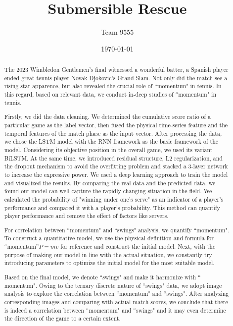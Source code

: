 \documentclass{mcmthesis}  %
\begin{document}
\title{Submersible Rescue}  %
\author{\small Team 9555}  %
\date{\today}  %



\begin{abstract}  %

	The 2023 Wimbledon \cite{vaswani2017attention} Gentlemen’s final witnessed a wonderful batter, a Spanish player ended great tennis player Novak Djokovic's Grand Slam. Not only did the match see a rising star apparence, but also revealed the crucial role of ``momentum" in tennis. In this regard, based on relevant data, we conduct in-deep studies of ``momentum" in tennis.

	Firstly, we did the data cleaning. We determined the cumulative score ratio of a particular game as the label vector, then fused the physical time-series feature and the temporal features of the match phase as the input vector. After processing the data, we chose the LSTM model with the RNN framework as the basic framework of the model. Considering its objective position in the overall game, we used its variant BiLSTM. At the same time, we introduced residual structure, L2 regularization, and the dropout mechanism to avoid the overfitting problem and stacked a 3-layer network to increase the expressive power. We used a deep learning approach to train the model and visualized the results. By comparing the real data and the predicted data, we found our model can well capture the rapidly changing situation in the field. We calculated the probability of "winning under one's serve" as an indicator of a player's performance and compared it with a player’s probability. This method can quantify player performance and remove the effect of factors like servers.

	For correlation between ``momentum" and ``swings" analysis, we quantify ``momentum". To construct a quantitative model, we use the physical definition and formula for ``momentum''$P=mv$ for reference and construct the initial model. Next, with the purpose of  making our model in line with the actual situation, we constantly try introducing parameters to optimize the initial model for the most suitable model.

	Based on the final model, we denote ``swings" and make it harmonize with `` momentum".  Owing to the ternary discrete nature of ``swings"  data, we adopt  image analysis to explore the correlation between ``momentum" and ``swings".  After analyzing corresponding images and comparing with actual match scores, we conclude that there is indeed a correlation between ``momentum" and ``swings" and it may even determine the direction of the game to a certain extent.


\end{abstract}
\end{document}
